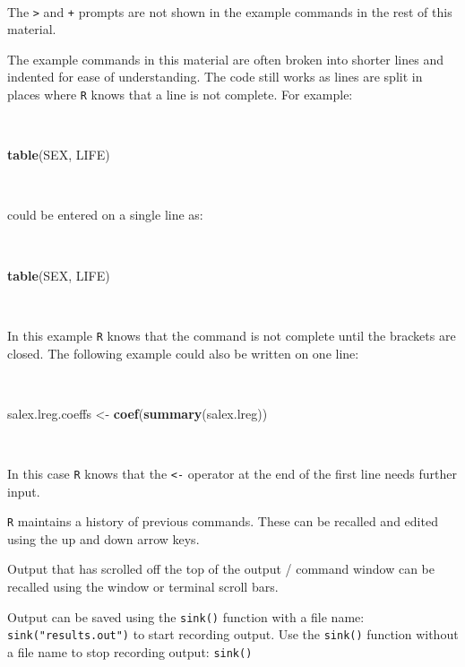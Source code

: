 \documentclass[12pt,a4paper]{book}
\newenvironment{Shaded}{\begin{snugshade}}{\end{snugshade}}
\newcommand{\KeywordTok}[1]{\textcolor[rgb]{0.13,0.29,0.53}{\textbf{#1}}}
\newcommand{\StringTok}[1]{\textcolor[rgb]{0.31,0.60,0.02}{#1}}
\newcommand{\NormalTok}[1]{#1}
\theoremstyle{definition}
\theoremstyle{definition}
\theoremstyle{definition}
\theoremstyle{remark}
\begin{document}
~

The \texttt{\textgreater{}} and \texttt{+} prompts are not shown in the
example commands in the rest of this material.

The example commands in this material are often broken into shorter
lines and indented for ease of understanding. The code still works as
lines are split in places where \texttt{R} knows that a line is not
complete. For example:

~

\begin{Shaded}
\begin{Highlighting}[]
\KeywordTok{table}\NormalTok{(SEX,}
\NormalTok{      LIFE)}
\end{Highlighting}
\end{Shaded}

~

could be entered on a single line as:

~

\begin{Shaded}
\begin{Highlighting}[]
\KeywordTok{table}\NormalTok{(SEX, LIFE)}
\end{Highlighting}
\end{Shaded}

~

In this example \texttt{R} knows that the command is not complete until
the brackets are closed. The following example could also be written on
one line:

~

\begin{Shaded}
\begin{Highlighting}[]
\NormalTok{salex.lreg.coeffs <-}
\StringTok{  }\KeywordTok{coef}\NormalTok{(}\KeywordTok{summary}\NormalTok{(salex.lreg))}
\end{Highlighting}
\end{Shaded}

~

In this case \texttt{R} knows that the \texttt{\textless{}-} operator at
the end of the first line needs further input.

\texttt{R} maintains a history of previous commands. These can be
recalled and edited using the up and down arrow keys.

Output that has scrolled off the top of the output / command window can
be recalled using the window or terminal scroll bars.

Output can be saved using the \texttt{sink()} function with a file name:
\texttt{sink("results.out")} to start recording output. Use the
\texttt{sink()} function without a file name to stop recording output:
\texttt{sink()}
\end{document}
